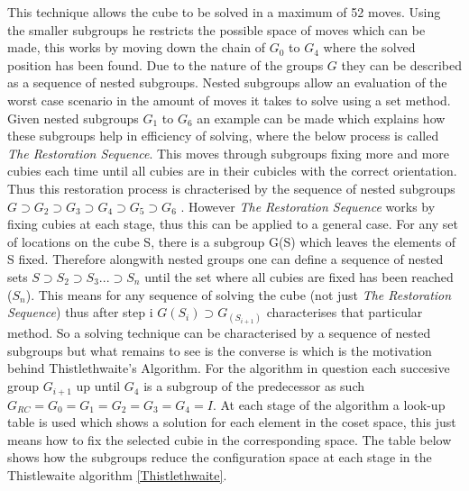 \documentclass{article}
\begin{document}
This technique allows the cube to be solved in a maximum of 52 moves. Using the smaller subgroups he restricts the possible space of moves which can be made, this works by moving down the chain of $G_{0}$ to $G_{4}$ where the solved position has been found. Due to the nature of the groups $G$ they can be described as a sequence of nested subgroups. Nested subgroups allow an evaluation of the worst case scenario in the amount of moves it takes to solve using a set method. Given nested subgroups $G_1$ to $G_6$ an example can be made which explains how these subgroups help in efficiency of solving, where the below process is called \textit{The Restoration Sequence}. This moves through subgroups fixing more and more cubies each time until all cubies are in their cubicles with the correct orientation. Thus this restoration process is chracterised by the sequence of nested subgroups $G \supset G_2 \supset G_3 \supset G_4 \supset G_5 \supset G_6 $ \cite{alexander1982handbook}.
However \textit{The Restoration Sequence} works by fixing cubies at each stage, thus this can be applied to a general case. For any set of locations on the cube S, there is a subgroup G(S) which leaves the elements of S fixed. Therefore alongwith nested groups one can define a sequence of nested sets $S \supset S_2 \supset S_3 ... \supset S_n $ until the set where all cubies are fixed has been reached ($S_n$). This means for any sequence of solving the cube (not just \textit{The Restoration Sequence}) thus after step i $G(S_i) \supset G_(S_{i+1})$ characterises that particular method. So a solving technique can be characterised by a sequence of nested subgroups but what remains to see is the converse is which is the motivation behind Thistlethwaite's Algorithm. For the algorithm in question each succesive group $G_{i+1}$ up until $G_4$ is a subgroup of the predecessor as such $G_{RC} = G_0 = G_1 = G_2 = G_3 = G_4= I$. At each stage of the algorithm a look-up table is used which shows a solution for each element in the coset space, this just means how to fix the selected cubie in the corresponding space. The table below shows how the subgroups reduce the configuration space at each stage in the Thistlewaite algorithm \ref{Thistlethwaite}.
\end{document}
